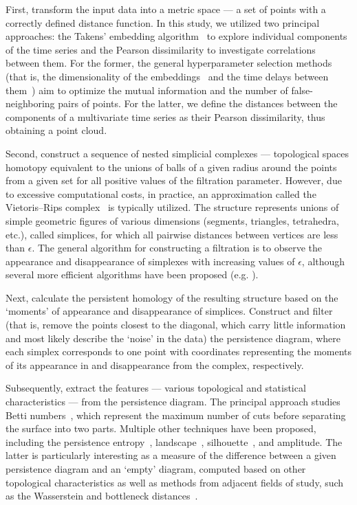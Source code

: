 \documentclass[journal,twoside,web]{ieeecolor2}
\begin{document}
First, transform the input data into a metric space --- a set of points with a correctly defined distance function. In this study, we utilized two principal approaches: the Takens' embedding algorithm~\cite{10.1007/BFb0091924,perea2013slidingwindowspersistenceapplication} to explore individual components of the time series and the Pearson dissimilarity to investigate correlations between them. For the former, the general hyperparameter selection methods (that is, the dimensionality of the embeddings~\cite{PhysRevA.45.3403} and the time delays between them~\cite{PhysRevA.33.1134}) aim to optimize the mutual information and the number of false-neighboring pairs of points. For the latter, we define the distances between the components of a multivariate time series as their Pearson dissimilarity, thus obtaining a point cloud.

Second, construct a sequence of nested simplicial complexes --- topological spaces homotopy equivalent to the unions of balls of a given radius around the points from a given set for all positive values of the filtration parameter. However, due to excessive computational costs, in practice, an approximation called the Vietoris--Rips complex~\cite{Vietoris1927} is typically utilized. The structure represents unions of simple geometric figures of various dimensions (segments, triangles, tetrahedra, etc.), called simplices, for which all pairwise distances between vertices are less than $\epsilon$. The general algorithm for constructing a filtration is to observe the appearance and disappearance of simplexes with increasing values of $\epsilon$, although several more efficient algorithms have been proposed (e.g. \cite{Bauer_2021}).

Next, calculate the persistent homology of the resulting structure based on the `moments' of appearance and disappearance of simplices. Construct and filter (that is, remove the points closest to the diagonal, which carry little information and most likely describe the `noise' in the data) the persistence diagram, where each simplex corresponds to one point with coordinates representing the moments of its appearance in and disappearance from the complex, respectively.

Subsequently, extract the features --- various topological and statistical characteristics --- from the persistence diagram. The principal approach studies Betti numbers~\cite{Zomorodian2005}, which represent the maximum number of cuts before separating the surface into two parts. Multiple other techniques have been proposed, including the persistence entropy~\cite{10.1007/978-3-319-29228-1_11}, landscape~\cite{bubenik2015statisticaltopologicaldataanalysis}, silhouette~\cite{chazal2013stochasticconvergencepersistencelandscapes}, and amplitude. The latter is particularly interesting as a measure of the difference between a given persistence diagram and an `empty' diagram, computed based on other topological characteristics as well as methods from adjacent fields of study, such as the Wasserstein and bottleneck distances~\cite{Efrat2001}.
\end{document}
